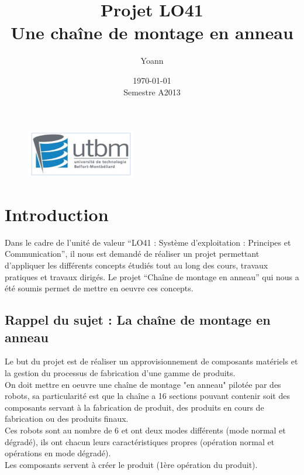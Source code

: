 \documentclass{report}
\begin{document}
\begin{figure}[!p!t]
\includegraphics[height=60pt]{utbm.png}
\end{figure}

\title{Projet LO41\\ \huge{\textbf{Une chaîne de montage en anneau}}}
\author{Yoann }
\date{\today \\Semestre A2013}


\maketitle \clearpage 
\tableofcontents %

\chapter{Introduction}
Dans le cadre de l’unité de valeur “LO41 : Système d'exploitation : Principes et Communication”, il nous est demandé de réaliser un projet permettant d’appliquer les différents concepts étudiés tout au long des cours, travaux pratiques et travaux dirigés. Le projet “Chaîne de montage en anneau” qui nous a été soumis permet de mettre en oeuvre ces concepts.
\section{Rappel du sujet : La chaîne de montage en anneau}
Le but du projet est de réaliser un approvisionnement de composants matériels et la gestion du processus de fabrication d'une gamme de produits.\\
On doit mettre en oeuvre une chaîne de montage "en anneau" pilotée par des robots, sa particularité est que la chaîne a 16 sections pouvant contenir soit des composants servant à la fabrication de produit, des produits en cours de fabrication ou des produits finaux.\\
Ces robots sont au nombre de 6 et ont deux modes différents (mode normal et dégradé), ils ont chacun leurs caractéristiques propres (opération normal et opérations en mode dégradé).\\
Les composants servent à créer le produit (1ère opération du produit).
\end{document}
